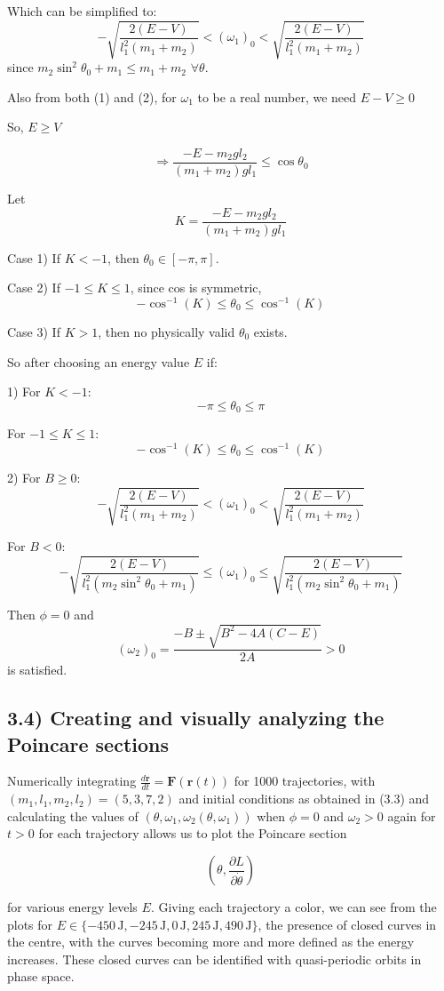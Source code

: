 \documentclass[12pt]{article}
\begin{document}
Which can be simplified to:
\[
-\sqrt{\frac{2(E-V)}{l_1^2(m_1+m_2)}}
<(\omega_1)_0
<
\sqrt{\frac{2(E-V)}{l_1^2(m_1+m_2)}}
\]
since $m_2\sin^2\theta_0+m_1\leq m_1+m_2$ $\forall\theta$.

Also from both (1) and (2), for $\omega_1$ to be a real number, we need $E-V\geq0$

So, $E\geq V$

\[
\Longrightarrow
\frac{-E-m_2gl_2}{(m_1+m_2)gl_1}
\leq\cos\theta_0
\]

Let
\[
K=\frac{-E-m_2gl_2}{(m_1+m_2)gl_1}
\]

Case 1) If $K<-1$, then $\theta_0\in[-\pi,\pi]$.

Case 2) If $-1\leq K\leq1$, since cos is symmetric,
\[
-\cos^{-1}(K)\leq\theta_0\leq\cos^{-1}(K)
\]

Case 3) If $K>1$, then no physically valid $\theta_0$ exists.

So after choosing an energy value $E$ if:

1) For $K<-1$:
\[
-\pi\leq\theta_0\leq\pi
\]

For $-1\leq K\leq1$:
\[
-\cos^{-1}(K)\leq\theta_0\leq\cos^{-1}(K)
\]

2) For $B\geq0$:
\[
-\sqrt{\frac{2(E-V)}{l_1^2(m_1+m_2)}}
<(\omega_1)_0
<
\sqrt{\frac{2(E-V)}{l_1^2(m_1+m_2)}}
\]

For $B<0$:
\[
-\sqrt{\frac{2(E-V)}
{l_1^2(m_2\sin^2\theta_0+m_1)}}
\leq(\omega_1)_0
\leq
\sqrt{\frac{2(E-V)}
{l_1^2(m_2\sin^2\theta_0+m_1)}}
\]

Then $\phi=0$ and
\[
(\omega_2)_0=
\frac{-B\pm\sqrt{B^2-4A(C-E)}}{2A}>0
\]
is satisfied.

\subsection*{3.4) Creating and visually analyzing the Poincare sections}

Numerically integrating $\frac{d\mathbf{r}}{dt}=\mathbf{F}(\mathbf{r}(t))$ for 1000 trajectories, with $(m_1,l_1,m_2,l_2)=(5,3,7,2)$ and initial conditions as obtained in (3.3) and calculating the values of $(\theta,\omega_1,\omega_2(\theta,\omega_1))$ when $\phi=0$ and $\omega_2>0$ again for $t>0$ for each trajectory allows us to plot the Poincare section

\[
\left(\theta,\frac{\partial L}{\partial\dot{\theta}}\right)
\]

for various energy levels $E$. Giving each trajectory a color, we can see from the plots for $E\in\{-450\,\mathrm{J},-245\,\mathrm{J},0\,\mathrm{J},245\,\mathrm{J},490\,\mathrm{J}\}$, the presence of closed curves in the centre, with the curves becoming more and more defined as the energy increases. These closed curves can be identified with quasi-periodic orbits in phase space.
\end{document}

